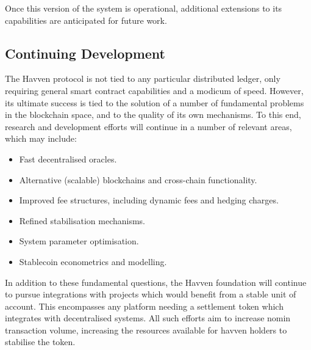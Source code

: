 Once this version of the system is operational, additional extensions to its
capabilities are anticipated for future work. \\


\subsection{Continuing Development}

\noindent The Havven protocol is not tied to any particular distributed ledger,
only requiring general smart contract capabilities and a modicum of speed.
However, its ultimate success is tied to the solution of a number of
fundamental problems in the blockchain space, and to the quality of its own
mechanisms. To this end, research and development efforts will continue in a
number of relevant areas, which may include:

\begin{itemize}
    \item Fast decentralised oracles.
    \item Alternative (scalable) blockchains and cross-chain functionality.
    \item Improved fee structures, including dynamic fees and hedging charges.
    \item Refined stabilisation mechanisms.
    \item System parameter optimisation.
    \item Stablecoin econometrics and modelling.
\end{itemize}

\noindent In addition to these fundamental questions, the Havven foundation will continue
to pursue integrations with projects which would benefit from a stable unit of
account. This encompasses any platform needing a settlement token which
integrates with decentralised systems. All such efforts aim to increase nomin
transaction volume, increasing the resources available for havven holders to
stabilise the token.
